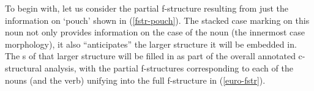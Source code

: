 \documentclass[output=paper,hidelinks]{langscibook}
\begin{document}


                            




To begin with, let us consider the
partial f-structure resulting from just the information on `pouch' shown in
(\ref{fstr-pouch}).  The stacked case marking on this noun not only provides
information on the case of the noun (the innermost case morphology), it also
``anticipates'' the larger structure it will be embedded in.  The {\PRED}s of
that larger structure will be filled in as part of the overall  annotated c-structural
analysis, with the partial f-structures corresponding to each of the nouns (and
the verb) unifying into the full f-structure in  (\ref{euro-fstr}). 
\end{document}
